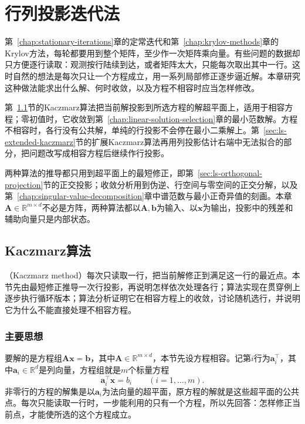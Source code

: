 \chapter{行列投影迭代法}
\label{sec:ls-row-projection}
\label{chap:row-projection-methods}

第~\ref{chap:stationary-iterations}章的定常迭代和第~\ref{chap:krylov-methods}章的Krylov方法，每轮都要用到整个矩阵，至少作一次矩阵乘向量。有些问题的数据却只方便逐行读取：观测按行陆续到达，或者矩阵太大，只能每次取出其中一行。这时自然的想法是每次只让一个方程成立，用一系列局部修正逐步逼近解。本章研究这种做法能求出什么解、何时收敛，以及方程不相容时应当怎样修改。

第~\ref{sec:ls-kaczmarz}节的Kaczmarz算法把当前解投影到所选方程的解超平面上，适用于相容方程；零初值时，它收敛到第~\ref{chap:linear-solution-selection}章的最小范数解。方程不相容时，各行没有公共解，单纯的行投影不会停在最小二乘解上。第~\ref{sec:ls-extended-kaczmarz}节的扩展Kaczmarz算法再用列投影估计右端中无法拟合的部分，把问题改写成相容方程后继续作行投影。

两种算法的推导都只用到超平面上的最短修正，即第~\ref{sec:ls-orthogonal-projection}节的正交投影；收敛分析用到伪逆、行空间与零空间的正交分解，以及第~\ref{chap:singular-value-decomposition}章中谱范数与最小正奇异值的刻画。本章$\bm A\in\mathbb R^{m\times d}$不必是方阵，两种算法都以$\bm A,\bm b$为输入、以$\bm x$为输出，投影中的残差和辅助向量只是内部状态。

\section{Kaczmarz算法}
\label{sec:ls-kaczmarz}

（Kaczmarz method）每次只读取一行，把当前解修正到满足这一行的最近点。本节先由最短修正推导一次行投影，再说明怎样依次处理各行；算法实现在贯穿例上逐步执行循环版本；算法分析证明它在相容方程上的收敛，讨论随机选行，并说明它为什么不能直接处理不相容方程。

\subsection{主要思想}

要解的是方程组$\bm A\bm x=\bm b$，其中$\bm A\in\mathbb R^{m\times d}$，本节先设方程相容。记第$i$行为$\bm a_i^\top$，其中$\bm a_i\in\mathbb R^d$是列向量，方程组就是$m$个标量方程
\[
 \bm a_i^\top\bm x=b_i\qquad(i=1,\ldots,m).
\]
非零行的方程的解集是以$\bm a_i$为法向量的超平面，原方程的解就是这些超平面的公共点。每次只能读取一行时，一步能利用的只有一个方程，所以先回答：怎样修正当前点，才能使所选的这个方程成立。


